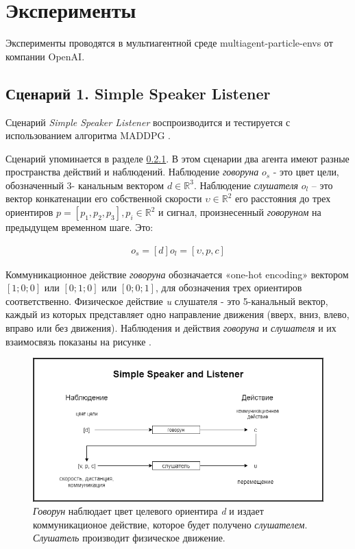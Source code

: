 \chapter{Эксперименты}

Эксперименты проводятся в мультиагентной среде multiagent-particle-envs \cite{multiagent-particle-envs} от компании OpenAI.


\section{Сценарий 1. Simple Speaker Listener}  \label{ch4:exp-ssl}

Сценарий \textit{Simple Speaker Listener} воспроизводится и тестируется с использованием алгоритма MADDPG \cite{lowe2017multiagent}.

Сценарий упоминается в разделе \hyperref[intro:ssl]{0.2.1}. В этом сценарии два агента имеют разные пространства действий и наблюдений. Наблюдение \textit{говоруна} $o_s$ - это цвет цели, обозначенный 3- канальным вектором $d \in \mathbb{R}^3$. Наблюдение \textit{слушателя} $o_l$ – это вектор конкатенации его собственной скорости $\upsilon \in \mathbb{R}^2$ его расстояния до трех ориентиров $p = [p_1, p_2, p_3], p_i \in \mathbb{R}^2$ и сигнал, произнесенный \textit{говоруном} на предыдущем временном шаге. Это:

\begin{equation}
    \begin{multlined}
        o_s = [d]
        o_l = [\upsilon, p, c]
    \end{multlined}
\end{equation}

Коммуникационное действие \textit{говоруна} обозначается «one-hot encoding» вектором $[1; 0; 0]$ или $[0; 1; 0]$ или $[0; 0; 1]$, для обозначения трех ориентиров соответственно.
Физическое действие \textit{u} слушателя - это 5-канальный вектор, каждый из которых представляет одно направление движения (вверх, вниз, влево, вправо или без движения). Наблюдения и действия \textit{говоруна} и \textit{слушателя} и их взаимосвязь показаны на рисунке .

\begin{figure}[ht!]
    \center
    \includegraphics [scale=0.60] {my_folder/images/ch4/simple_speaker_listener.png}
    \caption{\textit{Говорун} наблюдает цвет целевого ориентира \textit{d} и издает коммуникационое действие, которое будет получено \textit{слушателем}. \textit{Слушатель} производит физическое движение.}
    \label{fig:ch4-ssl}
\end{figure}

